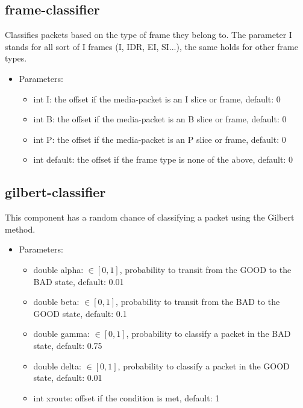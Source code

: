 \subsection{frame-classifier}
Classifies packets based on the type of frame they belong to. The parameter I stands for all sort of I frames (I, IDR, EI, SI...), the same holds for other frame types.
\begin{itemize}
\item Parameters:
\begin{itemize}
\item int I: the offset if the media-packet is an I slice or frame, default: 0
\item int B: the offset if the media-packet is an B slice or frame, default: 0
\item int P: the offset if the media-packet is an P slice or frame, default: 0
\item int default: the offset if the frame type is none of the above, default: 0
\end{itemize}
\end{itemize}
\subsection{gilbert-classifier}
This component has a random chance of classifying a packet using the Gilbert method.
\begin{itemize}
\item Parameters:
\begin{itemize}
\item double alpha: $\in[0,1]$, probability to transit from the GOOD to the BAD state, default: 0.01
\item double beta: $\in[0,1]$, probability to transit from the BAD to the GOOD state, default: 0.1
\item double gamma: $\in[0,1]$, probability to classify a packet in the BAD state, default: 0.75
\item double delta: $\in[0,1]$, probability to classify a packet in the GOOD state, default: 0.01
\item int xroute: offset if the condition is met, default: 1
\end{itemize}
\end{itemize}
